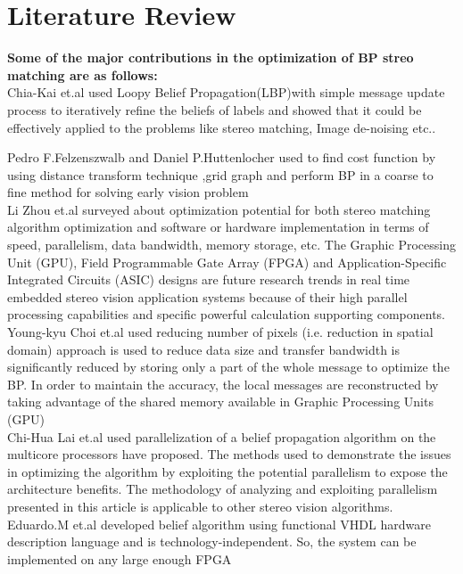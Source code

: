 
\chapter{\textbf{Literature Review}}

\textbf{Some of the major contributions in the optimization of BP streo matching are as follows:}\\
Chia-Kai et.al\cite{Chia} used Loopy Belief Propagation(LBP)with simple message update process to iteratively refine the beliefs of labels and showed that it could be effectively applied to the  problems like stereo matching, Image de-noising etc..

Pedro F.Felzenszwalb and Daniel P.Huttenlocher \cite{Felzen} used to find cost function by using distance transform technique ,grid graph and perform BP in a coarse to fine method  for solving early vision problem \\
Li Zhou et.al\cite{Li Zhoue} surveyed about  optimization potential for both stereo matching algorithm optimization and software or hardware implementation in terms of speed, parallelism, data bandwidth, memory storage, etc.
The Graphic Processing Unit (GPU), Field Programmable Gate Array (FPGA) and Application-Specific Integrated Circuits (ASIC) designs are future research trends in real time embedded stereo vision application systems because of their high parallel processing capabilities and specific powerful calculation supporting components.\\
Young-kyu Choi et.al\cite{Young} used reducing number of pixels (i.e. reduction in spatial domain) approach is used to reduce data size and transfer bandwidth is significantly reduced by storing only a part of the whole message to optimize the BP.
In order to maintain the accuracy, the local messages are reconstructed by taking advantage of the shared memory available in Graphic Processing Units (GPU)\\
Chi-Hua Lai et.al\cite{Chi-Hua Lai} used  parallelization of a belief propagation algorithm on the multicore processors have proposed. The methods used to demonstrate the issues in optimizing the algorithm by exploiting the potential parallelism to expose the architecture benefits. The methodology of analyzing and exploiting parallelism presented in this article is applicable to other stereo vision algorithms.\\
Eduardo.M et.al\cite{Ed} developed belief algorithm using functional VHDL hardware description language and is technology-independent. So, the system can be implemented on any large enough FPGA \\
